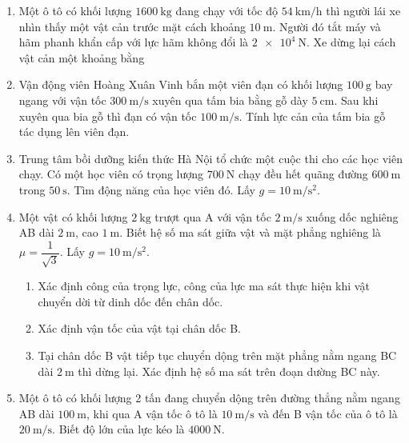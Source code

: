 \begin{enumerate}
	\item %
	Một ô tô có khối lượng $\SI{1600}{\kilogram}$ đang chạy với tốc độ $\SI{54}{\kilo\meter/\hour}$ thì người lái xe nhìn thấy một vật cản trước mặt cách khoảng $\SI{10}{\meter}$. Người đó tắt máy và hãm phanh khẩn cấp với lực hãm không đổi là $\SI{2e4}{\newton}$. Xe dừng lại cách vật cản một khoảng bằng
	\begin{mcq}(4)
		\item $\SI{1,2}{\meter}$.
		\item $\SI{1,0}{\meter}$.
		\item $\SI{1,4}{\meter}$.
		\item $\SI{1,5}{\meter}$.
	\end{mcq}
	\item %
	Vận động viên Hoàng Xuân Vinh bắn một viên đạn có khối lượng $\SI{100}{\gram}$ bay ngang với vận tốc $\SI{300}{\meter/\second}$ xuyên qua tấm bia bằng gỗ dày $\SI{5}{\centi\meter}$. Sau khi xuyên qua bia gỗ thì đạn có vận tốc $\SI{100}{\meter/\second}$. Tính lực cản của tấm bia gỗ tác dụng lên viên đạn.
	\item %
	Trung tâm bồi dưỡng kiến thức Hà Nội tổ chức một cuộc thi cho các học viên chạy. Có một học viên có trọng lượng $\SI{700}{\newton}$ chạy đều hết quãng đường $\SI{600}{\meter}$ trong $\SI{50}{\second}$. Tìm động năng của học viên đó. Lấy $g= \SI{10}{\meter/\second^2}$.
	\item %
	Một vật có khối lượng $\SI{2}{\kilogram}$ trượt qua A với vận tốc $\SI{2}{\meter/\second}$ xuống dốc nghiêng AB dài $\SI{2}{\meter}$, cao $\SI{1}{\meter}$. Biết hệ số ma sát giữa vật và mặt phẳng nghiêng là $\mu=\dfrac{1}{\sqrt{3}}$. Lấy $g= \SI{10}{\meter/\second^2}$.
	\begin{enumerate}[label=\alph*)]
		\item Xác định công của trọng lực, công của lực ma sát thực hiện khi vật chuyển dời từ dinh dốc đến chân dốc.
		\item Xác định vận tốc của vật tại chân dốc B.
		\item Tại chân dốc B vật tiếp tục chuyển dộng trên mặt phẳng nằm ngang BC dài $\SI{2}{\meter}$ thì dừng lại. Xác định hệ số ma sát trên đoạn dường BC này.
	\end{enumerate}
	\item %
	Một ô tô có khối lượng 2 tấn đang chuyển dộng trên đường thẳng nằm ngang AB dài $\SI{100}{\meter}$, khi qua A vận tốc ô tô là $\SI{10}{\meter/\second}$ và đến B vận tốc của ô tô là $\SI{20}{\meter/\second}$. Biết độ lớn của lực kéo là $\SI{4000}{\newton}$.

\end{enumerate}
